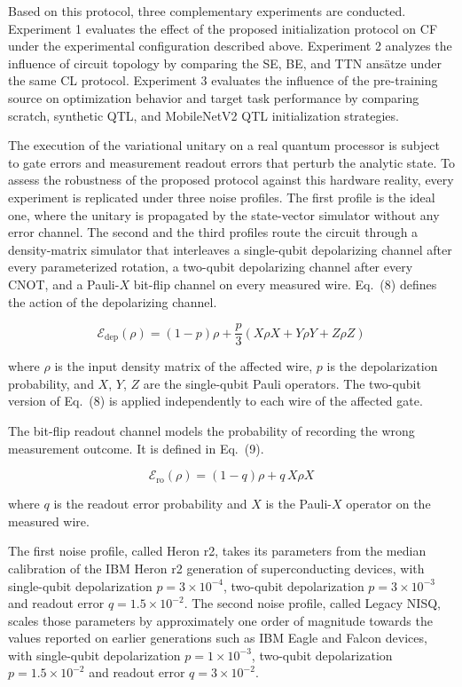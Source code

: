\documentclass[conference]{IEEEtran}
\begin{document}
Based on this protocol, three complementary experiments are conducted. Experiment 1 evaluates the effect of the proposed initialization protocol on CF under the experimental configuration described above. Experiment 2 analyzes the influence of circuit topology by comparing the SE, BE, and TTN ans\"atze under the same CL protocol. Experiment 3 evaluates the influence of the pre-training source on optimization behavior and target task performance by comparing scratch, synthetic QTL, and MobileNetV2 QTL initialization strategies.

The execution of the variational unitary on a real quantum processor is subject to gate errors and measurement readout errors that perturb the analytic state. To assess the robustness of the proposed protocol against this hardware reality, every experiment is replicated under three noise profiles. The first profile is the ideal one, where the unitary is propagated by the state-vector simulator without any error channel. The second and the third profiles route the circuit through a density-matrix simulator that interleaves a single-qubit depolarizing channel after every parameterized rotation, a two-qubit depolarizing channel after every CNOT, and a Pauli-$X$ bit-flip channel on every measured wire. Eq.~(8) defines the action of the depolarizing channel.

\begin{equation}
\mathcal{E}_{\text{dep}}(\rho) = (1-p)\rho + \frac{p}{3}\left( X\rho X + Y\rho Y + Z\rho Z \right)
\end{equation}

where $\rho$ is the input density matrix of the affected wire, $p$ is the depolarization probability, and $X$, $Y$, $Z$ are the single-qubit Pauli operators. The two-qubit version of Eq.~(8) is applied independently to each wire of the affected gate.

The bit-flip readout channel models the probability of recording the wrong measurement outcome. It is defined in Eq.~(9).

\begin{equation}
\mathcal{E}_{\text{ro}}(\rho) = (1-q)\rho + q\, X\rho X
\end{equation}

where $q$ is the readout error probability and $X$ is the Pauli-$X$ operator on the measured wire.

The first noise profile, called Heron r2, takes its parameters from the median calibration of the IBM Heron r2 generation of superconducting devices, with single-qubit depolarization $p = 3 \times 10^{-4}$, two-qubit depolarization $p = 3 \times 10^{-3}$ and readout error $q = 1.5 \times 10^{-2}$. The second noise profile, called Legacy NISQ, scales those parameters by approximately one order of magnitude towards the values reported on earlier generations such as IBM Eagle and Falcon devices, with single-qubit depolarization $p = 1 \times 10^{-3}$, two-qubit depolarization $p = 1.5 \times 10^{-2}$ and readout error $q = 3 \times 10^{-2}$.
\end{document}
